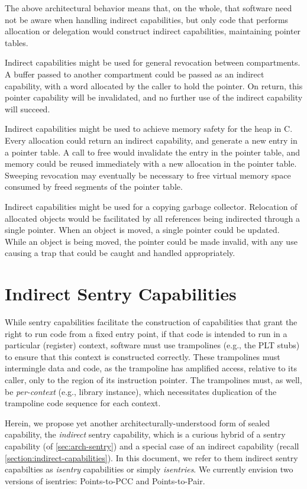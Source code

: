 The above architectural behavior means that, on the whole, that software need
not be aware when handling indirect capabilities, but only code that performs
allocation or delegation would construct indirect capabilities, maintaining
pointer tables.

Indirect capabilities might be used for general revocation between compartments.
A buffer passed to another compartment could be passed as an indirect
capability,
with a word allocated by the caller to hold the pointer.
On return, this pointer capability will be invalidated, and no further use
of the indirect capability will succeed.

Indirect capabilities might be used to achieve memory safety for the heap in C.
Every allocation could return an indirect capability, and generate a new entry
in a pointer table.
A call to free would invalidate the entry in the pointer table, and memory could
be reused immediately with a new allocation in the pointer table.
Sweeping revocation may eventually be necessary to free virtual memory space
consumed by freed segments of the pointer table.

Indirect capabilities might be used for a copying garbage collector.
Relocation of allocated objects would be facilitated by all references being
indirected through a single pointer.
When an object is moved, a single pointer could be updated.
While an object is being moved, the pointer could be made invalid, with any
use causing a trap that could be caught and handled appropriately.

\section{Indirect Sentry Capabilities} %
\label{app:exp:indsentry}

While sentry capabilities facilitate the construction of capabilities
that grant the right to run code from a fixed entry point, if that code is
intended to run in a particular (register) context, software must use
trampolines (e.g., the PLT stubs) to ensure that this context is constructed
correctly.  These trampolines must intermingle data and code, as the trampoline
has amplified access, relative to its caller, only to the region of its
instruction pointer.  The trampolines must, as well, be \emph{per-context}
(e.g., library instance), which necessitates duplication of the trampoline code
sequence for each context.

Herein, we propose yet another architecturally-understood form of sealed
capability, the \emph{indirect} sentry capability, which is a curious
hybrid of a sentry capability (of \cref{sec:arch-sentry}) and a special
case of an indirect capability (recall \cref{section:indirect-capabilities}).
In this document, we refer to them indirect sentry capabilties as \emph{isentry}
capabilities or simply \emph{isentries}. We currently envision two versions of
isentries: Points-to-PCC and Points-to-Pair.%

